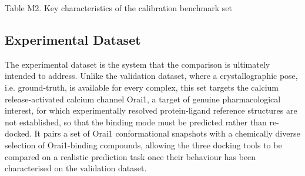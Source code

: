 Table M2. Key characteristics of the calibration benchmark set

\hypertarget{experimental-dataset}{%
\subsection{Experimental Dataset}\label{experimental-dataset}}

The experimental dataset is the system that the comparison is ultimately intended to address. Unlike the validation dataset, where a crystallographic pose, i.e. ground-truth, is available for every complex, this set targets the calcium release-activated calcium channel Orai1, a target of genuine pharmacological interest, for which experimentally resolved protein-ligand reference structures are not established, so that the binding mode must be predicted rather than re-docked. It pairs a set of Orai1 conformational snapshots with a chemically diverse selection of Orai1-binding compounds, allowing the three docking tools to be compared on a realistic prediction task once their behaviour has been characterised on the validation dataset.

